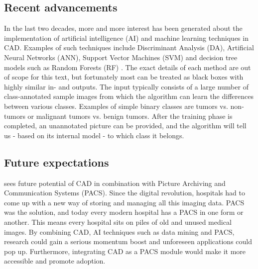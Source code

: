 \subsection{Recent advancements}\label{ssec:cadadv}
In the last two decades, more and more interest has been generated about the
implementation of artificial intelligence (AI) and machine learning techniques
in CAD. Examples of such techniques include Discriminant Analysis (DA),
Artificial Neural Networks (ANN), Support Vector Machines (SVM) and decision
tree models such as Random Forests (RF) \cite{lungcadreview, ginneken}. The
exact details of each method are out of scope for this text, but fortunately
most can be treated as black boxes with highly similar in- and outputs. The
input typically consists of a large number of class-annotated sample images from
which the algorithm can learn the differences between various classes. Examples
of simple binary classes are tumors vs. non-tumors or malignant tumors vs.
benign tumors. After the training phase is completed, an unannotated picture can
be provided, and the algorithm will tell us - based on its internal model - to
which class it belongs.

\subsection{Future expectations}
\cite{cadhistory} sees future potential of CAD in combination with Picture
Archiving and Communication Systems (PACS). Since the digital revolution,
hospitals had to come up with a new way of storing and managing all this imaging
data. PACS was the solution, and today every modern hospital has a PACS in one
form or another. This means every hospital sits on piles of old and unused
medical images. By combining CAD, AI techniques such as data mining and PACS,
research could gain a serious momentum boost and unforeseen applications could
pop up. Furthermore, integrating CAD as a PACS module would make it more
accessible and promote adoption.
